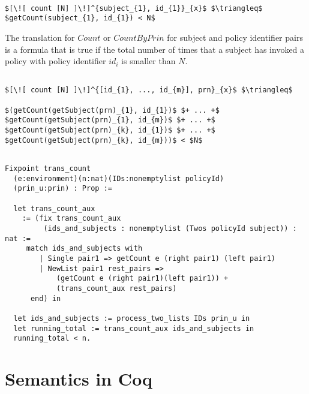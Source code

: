 \lstset{mathescape, language=AST}  
\begin{lstlisting}[frame=single, caption={Count Translation {$\colon$} subject and policyId pair},label={lst:transcountSinglePair}]

$[\![ count [N] ]\!]^{subject_{1}, id_{1}}_{x}$ $\triangleq$ $getCount(subject_{1}, id_{1}) < N$
\end{lstlisting}

The translation for $Count$ or $CountByPrin$ for subject and policy identifier pairs is a formula that is true if the total number of times that a subject has invoked a policy with policy identifier $id_{i}$ is smaller than $N$.

\lstset{mathescape, language=AST}  
\begin{lstlisting}[frame=single, caption={Count Translation {$\colon$} subject and policyId pairs},label={lst:transcountPairs}]

$[\![ count [N] ]\!]^{[id_{1}, ..., id_{m}], prn}_{x}$ $\triangleq$ 

$(getCount(getSubject(prn)_{1}, id_{1})$ $+ ... +$ $getCount(getSubject(prn)_{1}, id_{m})$ $+ ... +$ $getCount(getSubject(prn)_{k}, id_{1})$ $+ ... +$ $getCount(getSubject(prn)_{k}, id_{m}))$ < $N$


\end{lstlisting}




\begin{lstlisting}
Fixpoint trans_count 
  (e:environment)(n:nat)(IDs:nonemptylist policyId)
  (prin_u:prin) : Prop := 

  let trans_count_aux 
    := (fix trans_count_aux
         (ids_and_subjects : nonemptylist (Twos policyId subject)) : nat :=
     match ids_and_subjects with
        | Single pair1 => getCount e (right pair1) (left pair1)
        | NewList pair1 rest_pairs =>
            (getCount e (right pair1)(left pair1)) +
            (trans_count_aux rest_pairs)
      end) in
  
  let ids_and_subjects := process_two_lists IDs prin_u in
  let running_total := trans_count_aux ids_and_subjects in
  running_total < n.
\end{lstlisting}

\section{Semantics in Coq}
\label{sec:Semanticsincoq}

